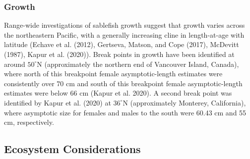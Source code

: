 \documentclass[11pt,
  english,
  a4paper,
]{article}
\begin{document}
\leavevmode\tagmcend\tagstructend\par


\hypertarget{growth}{%
\subsubsection{Growth}\label{growth}}

\leavevmode\tagmcend\tagstructend


Range-wide investigations of sablefish growth suggest that growth varies across the northeastern Pacific, with a generally increasing cline in length-at-age with latitude ({Echave et al. (2012)\leavevmode\tagmcend\tagstructend}, {Gertseva, Matson, and Cope (2017)\leavevmode\tagmcend\tagstructend}, {McDevitt (1987)\leavevmode\tagmcend\tagstructend}, {Kapur et al. (2020)\leavevmode\tagmcend\tagstructend}). Break points in growth have been identified at around {\(50^\circ\)\leavevmode\tagmcend\tagstructend}N (approximately the northern end of Vancouver Island, Canada), where north of this breakpoint female asymptotic-length estimates were consistently over 70 cm and south of this breakpoint female asymptotic-length estimates were below 66 cm {(Kapur et al. 2020)\leavevmode\tagmcend\tagstructend}. A second break point was identified by {Kapur et al. (2020)\leavevmode\tagmcend\tagstructend} at {\(36^\circ\)\leavevmode\tagmcend\tagstructend}N (approximately Monterey, California), where asymptotic size for females and males to the south were 60.43 cm and 55 cm, respectively.

\leavevmode\tagmcend\tagstructend\par


\hypertarget{ecosystem-considerations-1}{%
\subsection{Ecosystem Considerations}\label{ecosystem-considerations-1}}
\end{document}
